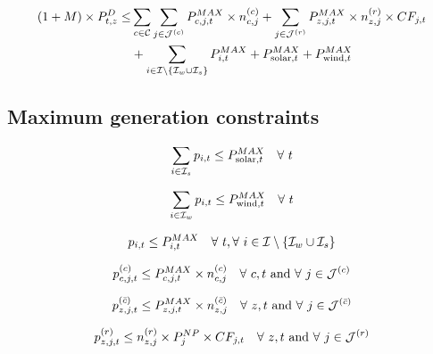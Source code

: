 \documentclass[11pt, oneside]{article}   	%
\newcommand{\bc}{\bar{c}}
\begin{document}
\begin{equation} \label{eq:reserve}
\begin{split}
(1+M)\times P^D_{t, z} \le & \sum_{c \in \mathcal{C}} \sum_{j \in \mathcal{J}^{(c)}} P^{MAX}_{c, j, t} \times n^{(c)}_{c, j} +   \sum_{j \in \mathcal{J}^{(r)}} P^{MAX}_{z, j, t} \times n^{(r)}_{z, j}\times CF_{j, t} \\
& + \sum_{i \in \mathcal{I} \setminus \{\mathcal{I}_w \cup \mathcal{I}_s \}} P^{MAX}_{i, t} + P^{MAX}_{\text{solar}, t} + P^{MAX}_{\text{wind}, t}
\end{split}
\end{equation}

\subsection{Maximum generation constraints}

\begin{equation} \label{eq:ex_solar}
\begin{split}
\sum_{i \in \mathcal{I}_s} p_{i, t} \le P^{MAX}_{\text{solar}, t} \quad \forall~t
\end{split}
\end{equation}

\begin{equation} \label{eq:ex_wind}
\begin{split}
\sum_{i \in \mathcal{I}_w} p_{i, t} \le P^{MAX}_{\text{wind}, t} \quad \forall~t
\end{split}
\end{equation}

\begin{equation} \label{eq:ex_therm}
\begin{split}
p_{i, t} \le P^{MAX}_{i, t} \quad \forall~t, \forall~i \in \mathcal{I} \setminus \{\mathcal{I}_w \cup \mathcal{I}_s \}
\end{split}
\end{equation}

\begin{equation} \label{eq:new_therm}
\begin{split}
p^{(c)}_{c, j, t} \le P^{MAX}_{c, j, t} \times n^{(c)}_{c, j} \quad \forall~c, t  \text{ and }\forall~j\in \mathcal{J}^{(c)}
\end{split}
\end{equation}

\begin{equation} \label{eq:new_therm2}
\begin{split}
p^{(\bc)}_{z, j, t} \le P^{MAX}_{z, j, t} \times n^{(\bc)}_{z, j} \quad \forall~z, t  \text{ and }\forall~j\in \Jc^{(\bc)}
\end{split}
\end{equation}

\begin{equation} \label{eq:new_ren}
\begin{split}
p^{(r)}_{z, j, t} \le n^{(r)}_{z, j}\times P^{NP}_{j} \times CF_{j, t}  \quad \forall~z, t  \text{ and }\forall~j\in \mathcal{J}^{(r)}
\end{split}
\end{equation}
\end{document}
